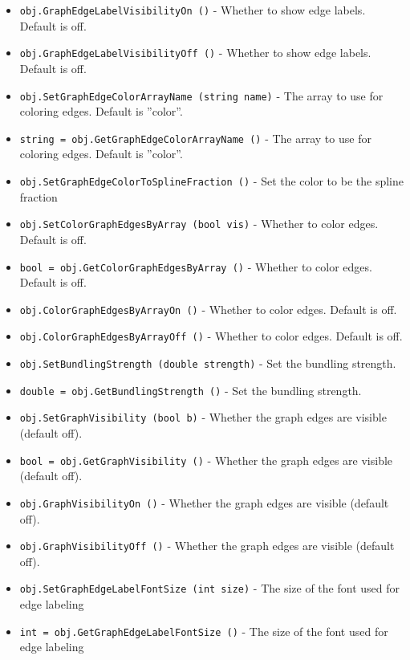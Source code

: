 \begin{itemize}
\item  \verb|obj.GraphEdgeLabelVisibilityOn ()| -  Whether to show edge labels.  Default is off.

\item  \verb|obj.GraphEdgeLabelVisibilityOff ()| -  Whether to show edge labels.  Default is off.

\item  \verb|obj.SetGraphEdgeColorArrayName (string name)| -  The array to use for coloring edges.  Default is ''color''.

\item  \verb|string = obj.GetGraphEdgeColorArrayName ()| -  The array to use for coloring edges.  Default is ''color''.

\item  \verb|obj.SetGraphEdgeColorToSplineFraction ()| -  Set the color to be the spline fraction

\item  \verb|obj.SetColorGraphEdgesByArray (bool vis)| -  Whether to color edges.  Default is off.

\item  \verb|bool = obj.GetColorGraphEdgesByArray ()| -  Whether to color edges.  Default is off.

\item  \verb|obj.ColorGraphEdgesByArrayOn ()| -  Whether to color edges.  Default is off.

\item  \verb|obj.ColorGraphEdgesByArrayOff ()| -  Whether to color edges.  Default is off.

\item  \verb|obj.SetBundlingStrength (double strength)| -  Set the bundling strength.

\item  \verb|double = obj.GetBundlingStrength ()| -  Set the bundling strength.

\item  \verb|obj.SetGraphVisibility (bool b)| -  Whether the graph edges are visible (default off).

\item  \verb|bool = obj.GetGraphVisibility ()| -  Whether the graph edges are visible (default off).

\item  \verb|obj.GraphVisibilityOn ()| -  Whether the graph edges are visible (default off).

\item  \verb|obj.GraphVisibilityOff ()| -  Whether the graph edges are visible (default off).

\item  \verb|obj.SetGraphEdgeLabelFontSize (int size)| -  The size of the font used for edge labeling

\item  \verb|int = obj.GetGraphEdgeLabelFontSize ()| -  The size of the font used for edge labeling

\end{itemize}
